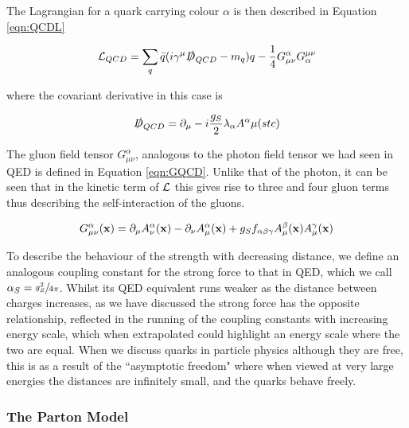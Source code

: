 The Lagrangian for a quark carrying colour $\alpha$ is then described in Equation \ref{eqn:QCDL}

\begin{equation}
{\mathcal{L}}_{QCD} = \sum_{q} \bar{q}(i \gamma^{\mu}\slashed{D}_{QCD} - m_{q}) q - \frac{1}{4}G^{\alpha}_{\mu \nu}G^{\mu \nu}_{\alpha}
\label{eqn:QCDL}
\end{equation}

where the covariant derivative in this case is


\begin{equation}
\slashed{D}_{QCD} = \partial_{\mu} - i\frac{g_{S}}{2}\lambda_{\alpha}A^{\alpha}{\mu}(stc)
\label{eqn:QCDD}
\end{equation}

The gluon field tensor $G^{\alpha}_{\mu \nu}$, analogous to the photon field tensor we had seen in QED is defined in Equation \ref{eqn:GQCD}. Unlike that of the photon, it can be seen that in the kinetic term of ${\mathcal{L}}$ this gives rise to three and four gluon terms thus describing the self-interaction of the gluons. 

\begin{equation}
G^{\alpha}_{\mu \nu} (\mathbf{x}) = \partial_{\mu} A^{\alpha}_{\nu} (\mathbf{x}) - \partial_{\nu}A^{\alpha}_{\mu}(\mathbf{x}) + g_{S} f_{\alpha \beta \gamma} A^{\beta}_{\mu}(\mathbf{x})A^{\gamma}_{\mu}(\mathbf{x})
\label{eqn:GQCD}
\end{equation}



 To describe the behaviour of the strength with decreasing distance, we define an analogous coupling constant for the strong force to that in QED, which we call $\alpha_{S} = \sfrac{g_{S}^{2}}{4\pi}$. Whilst its QED equivalent runs weaker as the distance between charges increases, as we have discussed the strong force has the opposite relationship, reflected in the running of the coupling constants with increasing energy scale, which when extrapolated could highlight an energy scale where the two are equal. When we discuss quarks in particle physics although they are free, this is as a result of the ``asymptotic freedom" where when viewed at very large energies the distances are infinitely small, and the quarks behave freely. 
 
 \subsubsection{The Parton Model}
 
